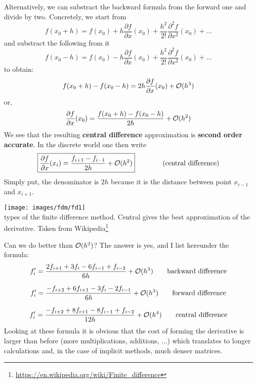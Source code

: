 Alternatively, we can substract the backward formula from the forward one 
and divide by two. Concretely, we start from 
\begin{equation}
f(x_0+h)=f(x_0)+ 
h \frac{\partial f}{\partial x}(x_0)  + 
\frac{h^2}{2!} \frac{\partial^2 f}{\partial x^2}(x_0)  + \dots  
\end{equation}
and substract the following from it
\begin{equation}
f(x_0-h)=f(x_0)-
h \frac{\partial f}{\partial x}(x_0)  + 
\frac{h^2}{2!} \frac{\partial^2 f}{\partial x^2}(x_0)  + \dots 
\end{equation}
to obtain:
\begin{equation}
f(x_0+h)-f(x_0-h) = 2h \frac{\partial f}{\partial x}(x_0)  +{\cal O}(h^3) 
\end{equation}
or, 
\[
\frac{\partial f}{\partial x}(x_0)  = \frac{ f(x_0+h)-f(x_0-h)}{2h} +{\cal O}(h^2) 
\]
We see that the resulting {\bf central difference} approximation is 
{\bf second order accurate}. In the discrete world one then write
\begin{equation}
\boxed{
\frac{\partial f}{\partial x}(x_i) 
= \frac{f_{i+1}-f_{i-1}}{2h} + {\cal O}(h^2)
}
\qquad
\qquad
\text{(central difference)} 
\end{equation}
Simply put, the denominator is $2h$ because it is the distance between point $x_{i-1}$ and $x_{i+1}$.


\begin{center}
\texttt{[image: images/fdm/fd1]}\\
{ types of the finite difference method. Central gives the best approximation of the derivative.
Taken from Wikipedia\footnote{\url{https://en.wikipedia.org/wiki/Finite_difference}}
}
\end{center}

Can we do better than ${\cal O}(h^2)$? The answer is yes, and I list hereunder the 
formula:
\begin{equation}
f_i' = \frac{2 f_{i+1} + 3 f_i - 6 f_{i-1} + f_{i-2}}{6 h} + {\cal O}(h^3)
\qquad
\text{backward difference}
\end{equation}

\begin{equation}
f_i' = \frac{-  f_{i+2} +6 f_{i+1} - 3 f_{i} -2 f_{i-1}}{6 h} + {\cal O}(h^3)
\qquad
\text{forward difference}
\end{equation}

\begin{equation}
f_i' = \frac{-  f_{i+2} +8 f_{i+1} - 8 f_{i-1} + f_{i-2}}{12 h} + {\cal O}(h^4)
\qquad
\text{central difference}
\end{equation}
Looking at these formula it is obvious that the cost of forming the derivative 
is larger than before (more multiplications, additions, ...) which translates
to longer calculations and, in the case of implicit methods, much denser matrices. 


